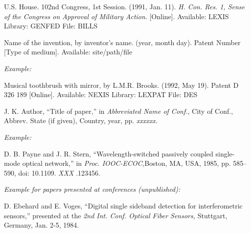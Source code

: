 \documentclass[journal,twoside,web]{ieeecolor}
\begin{document}
\begin{thebibliography}{00}
 U.S. House. 102nd Congress, 1st Session. (1991, Jan. 11). {\it H. Con. Res. 1, Sense of the Congress on Approval of Military Action}. [Online]. Available: LEXIS Library: GENFED File: BILLS
\end{thebibliography}


\noindent Name of the invention, by inventor's name. (year, month day). Patent Number  [Type
of medium]. Available:  {site/path/file}

{\it Example:}{\vadjust{\vspace*{-2.5em}}}

\begin{thebibliography}{00}
 Musical toothbrush with mirror, by L.M.R. Brooks. (1992, May 19). Patent D 326 189 [Online]. Available: NEXIS Library: LEXPAT File: DES
\end{thebibliography}



\noindent J. K. Author, ``Title of paper,'' in {\it Abbreviated Name of Conf.}, City of Conf., Abbrev. State (if
given), Country, year, pp. {\it xxxxxx.}

{\it Example:}{\vadjust{\vspace*{-2.5em}}}

\begin{thebibliography}{00}
 D. B. Payne and J. R. Stern, ``Wavelength-switched passively coupled single-mode optical network,'' in {\it Proc. IOOC-ECOC,}Boston, MA, USA,  1985,
pp. 585--590, doi:  {10.1109.} {{\it XXX}} {.123456}.
\end{thebibliography}

{\it Example for papers presented at conferences (unpublished):}{\vadjust{\vspace*{-2.5em}}}

\begin{thebibliography}{00}
 D. Ebehard and E. Voges, ``Digital single sideband detection for interferometric sensors,'' presented at the {\it 2nd Int. Conf. Optical Fiber Sensors,} Stuttgart, Germany, Jan. 2-5, 1984.
\end{thebibliography}

\end{document}
